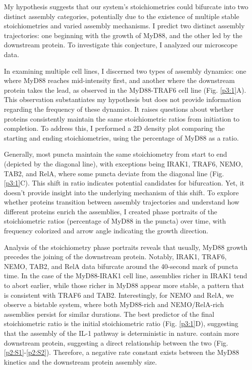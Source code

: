My hypothesis suggests that our system's stoichiometries could bifurcate into two distinct assembly categories, potentially due to the existence of multiple stable stoichiometries and varied assembly mechanisms. I predict two distinct assembly trajectories: one beginning with the growth of MyD88, and the other led by the downstream protein. To investigate this conjecture, I analyzed our microscope data.

In examining multiple cell lines, I discerned two types of assembly dynamics: one where MyD88 reaches mid-intensity first, and another where the downstream protein takes the lead, as observed in the MyD88-TRAF6 cell line (Fig. \ref{p3:1}A). This observation substantiates my hypothesis but does not provide information regarding the frequency of these dynamics. It raises questions about whether proteins consistently maintain the same stoichiometric ratios from initiation to completion. To address this, I performed a 2D density plot comparing the starting and ending stoichiometries, using the percentage of MyD88 as a ratio.

Generally, most puncta maintain the same stoichiometry from start to end (depicted by the diagonal line), with exceptions being IRAK1, TRAF6, NEMO, TAB2, and RelA, where some puncta deviate from the diagonal line (Fig. \ref{p3:1}C). This shift in ratio indicates potential candidates for bifurcation. Yet, it doesn't provide insight into the underlying mechanism of this shift. To explore whether proteins transition between assembly trajectories and understand how different proteins enrich the assemblies, I created phase portraits of the stoichiometric ratios (percentage of MyD88 in the puncta) over time, with frequency colorized and arrow angle indicating the growth direction.

Analysis of the stoichiometry phase portraits reveals that usually, MyD88 growth precedes the joining of the downstream protein. Notably, IRAK1, TRAF6, NEMO, TAB2, and RelA data bifurcate around the 40-second mark of puncta time. In the case of the MyD88-IRAK1 cell line, assemblies richer in IRAK1 tend to abort earlier, while those richer in MyD88 appear more stable, a pattern that is consistent with TRAF6 and TAB2. Interestingly, for NEMO and RelA, we observe a bistable system, where both MyD88-rich and NEMO/RelA-rich assemblies persist for similar durations. The best predictor of the final stoichiometric ratio is the initial stoichiometric ratio (Fig. \ref{p3:1}D), suggesting that the assembly of the IL-1 pathway is deterministic in nature.
 contain more downstream protein, suggesting a direct relationship between the two (Fig. \ref{p2:S1}-\ref{p2:S2}). Therefore, a negative rate constant exists between the MyD88 kinetics and the downstream protein assembly size.


